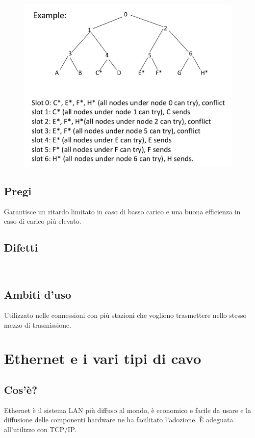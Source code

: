 \begin{figure}[H]
\centering
\includegraphics[scale=0.7]{res/img/26_AdaptiveTreeProtocol.png}
\end{figure}

\subsection{Pregi}
Garantisce un ritardo limitato in caso di basso carico e una buona efficienza in caso di carico più elevato.
\subsection{Difetti}
--
\subsection{Ambiti d'uso}
Utilizzato nelle connessioni con più stazioni che vogliono trasmettere nello stesso mezzo di trasmissione.

\section{Ethernet e i vari tipi di cavo}
\subsection{Cos'è?}
Ethernet è il sistema LAN più diffuso al mondo, è economico e facile da usare e la diffusione delle componenti hardware ne ha facilitato l’adozione. È adeguata all’utilizzo con TCP/IP.

